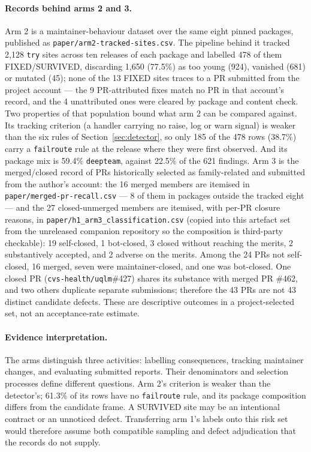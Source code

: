 \documentclass[10pt,a4paper]{article}
\begin{document}
\paragraph{Records behind arms 2 and 3.}
Arm 2 is a maintainer-behaviour dataset over the same eight
pinned packages, published as \texttt{paper/arm2-tracked-sites.csv}. The
pipeline behind it tracked 2{,}128 \texttt{try} sites across ten releases of
each package and labelled 478 of them FIXED/SURVIVED, discarding 1{,}650
(77.5\%) as too young (924), vanished (681) or mutated (45); none of the 13
FIXED sites traces to a PR submitted from the project account --- the 9
PR-attributed fixes match no PR in that account's record, and the 4 unattributed
ones were cleared by package and content
check. Two properties of that population bound what arm 2 can be compared
against. Its tracking criterion (a handler carrying no raise, log or warn
signal) is weaker than the six rules of Section~\ref{sec:detector}, so only
185 of the 478 rows (38.7\%) carry a \texttt{failroute} rule at the release
where they were first observed. And its package mix is 59.4\% \texttt{deepteam},
against 22.5\% of the 621 findings. Arm 3 is the merged/closed record of PRs historically selected as family-related and submitted from the author's account: the 16 merged members
are itemised in \texttt{paper/merged-pr-recall.csv} --- 8 of them in packages
outside the tracked eight --- and the 27 closed-unmerged members are itemised,
with per-PR closure reasons, in \texttt{paper/h1\_arm3\_classification.csv}
(copied into this artefact set from the unreleased companion repository so the
composition is third-party checkable): 19 self-closed, 1 bot-closed, 3 closed
without reaching the merits, 2 substantively accepted, and 2 adverse on the
merits. Among the 24 PRs not self-closed, 16 merged, seven were maintainer-closed, and
one was bot-closed. One closed PR (\texttt{cvs-health/uqlm}\#427) shares its
substance with merged PR \#462, and two others duplicate separate submissions;
therefore the 43 PRs are not 43 distinct candidate defects. These are descriptive
outcomes in a project-selected set, not an acceptance-rate estimate.

\paragraph{Evidence interpretation.}
The arms distinguish three activities: labelling consequences, tracking
maintainer changes, and evaluating submitted reports. Their denominators
and selection processes define different questions. Arm 2's criterion is
weaker than the detector's; 61.3\% of its rows have no \texttt{failroute}
rule, and its package composition differs from the candidate frame.
A SURVIVED site may be an intentional contract or an unnoticed defect.
Transferring arm 1's labels onto this risk set would therefore assume both
compatible sampling and defect adjudication that the records do not supply.
\end{document}
